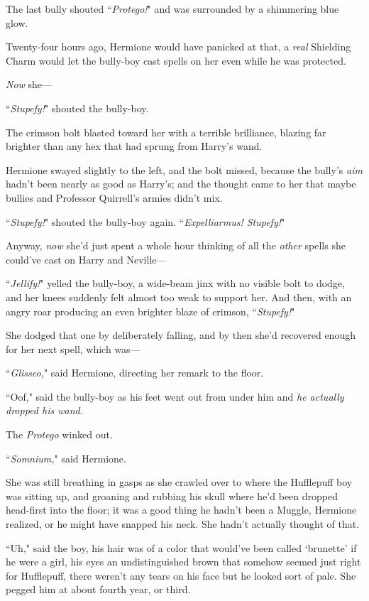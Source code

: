The last bully shouted ``\emph{Protego!}" and was surrounded by a shimmering blue glow.

Twenty-four hours ago, Hermione would have panicked at that, a \emph{real} Shielding Charm would let the bully-boy cast spells on her even while he was protected.

\emph{Now} she---

``\emph{Stupefy!}" shouted the bully-boy.

The crimson bolt blasted toward her with a terrible brilliance, blazing far brighter than any hex that had sprung from Harry's wand.

Hermione swayed slightly to the left, and the bolt missed, because the bully's \emph{aim} hadn't been nearly as good as Harry's; and the thought came to her that maybe bullies and Professor Quirrell's armies didn't mix.

``\emph{Stupefy!}" shouted the bully-boy again. ``\emph{Expelliarmus! Stupefy!}"

Anyway, \emph{now} she'd just spent a whole hour thinking of all the \emph{other} spells she could've cast on Harry and Neville---

``\emph{Jellify!}" yelled the bully-boy, a wide-beam jinx with no visible bolt to dodge, and her knees suddenly felt almost too weak to support her. And then, with an angry roar producing an even brighter blaze of crimson, ``\emph{Stupefy!}"

She dodged that one by deliberately falling, and by then she'd recovered enough for her next spell, which was---

``\emph{Glisseo,}" said Hermione, directing her remark to the floor.

``Oof," said the bully-boy as his feet went out from under him and \emph{he actually dropped his wand}.

The \emph{Protego} winked out.

``\emph{Somnium,}" said Hermione.

She was still breathing in gasps as she crawled over to where the Hufflepuff boy was sitting up, and groaning and rubbing his skull where he'd been dropped head-first into the floor; it was a good thing he hadn't been a Muggle, Hermione realized, or he might have snapped his neck. She hadn't actually thought of that.

``Uh," said the boy, his hair was of a color that would've been called `brunette' if he were a girl, his eyes an undistinguished brown that somehow seemed just right for Hufflepuff, there weren't any tears on his face but he looked sort of pale. She pegged him at about fourth year, or third.

